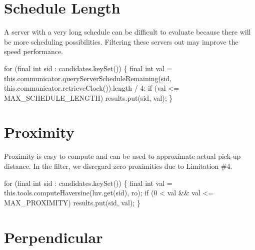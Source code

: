 \section{Schedule Length}

A server with a very long schedule can be difficult to evaluate because there
will be more scheduling possibilities. Filtering these servers out may improve
the speed performance.

\nwenddocs{}\endmoddef\nwstartdeflinemarkup{}\nwenddeflinemarkup
for (final int sid : candidates.keySet()) \{
  final int val = this.communicator.queryServerScheduleRemaining(sid,
      this.communicator.retrieveClock()).length / 4;
  if (val <= MAX_SCHEDULE_LENGTH)
    results.put(sid, val);
\}
\nwendcode{}\nwdocspar

\section{Proximity}

Proximity is easy to compute and can be used to approximate actual pick-up
distance. In the filter, we disregard zero proximities due to Limitation \#4.

\nwenddocs{}\endmoddef\nwstartdeflinemarkup{}\nwenddeflinemarkup
for (final int sid : candidates.keySet()) \{
  final int val = this.tools.computeHaversine(luv.get(sid), ro);
  if (0 < val && val <= MAX_PROXIMITY)
    results.put(sid, val);
\}
\nwendcode{}\nwdocspar

\section{Perpendicular}

